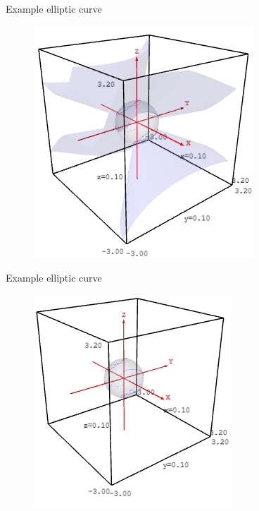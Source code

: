 \documentclass[aspectratio=169,xcolor=dvipsnames]{beamer}
\begin{document}
\begin{frame}{Example elliptic curve}
    \begin{figure}
        \centering
        \href{https://doktor-ziel.github.io/ECC/elliptic-curve-01.html}{\includegraphics[height=0.8\textheight]{elliptic-curve-01.png}}
    \end{figure}
\end{frame}


\begin{frame}{Example elliptic curve}
    \begin{figure}
        \centering
        \href{https://doktor-ziel.github.io/ECC/elliptic-curve-02.html}{\includegraphics[height=0.8\textheight]{elliptic-curve-02.png}}
    \end{figure}
\end{frame}

\end{document}
